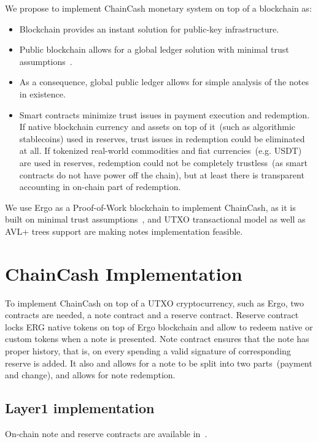 \documentclass{article}   %
\newcommand{\cc}{ChainCash}
\begin{document}
We propose to implement \cc{} monetary system on top of a blockchain as:

\begin{itemize}
  \item{} Blockchain provides an instant solution for public-key infrastructure.
  \item{} Public blockchain allows for a global ledger solution with minimal trust assumptions~\cite{kya}.
  \item{} As a consequence, global public ledger allows for simple analysis of the notes in existence.
  \item{} Smart contracts minimize trust issues in payment execution and redemption. If native blockchain currency and assets on top of it~(such as algorithmic stablecoins) used in reserves, trust issues in redemption could be eliminated at all. If tokenized real-world commodities and fiat currencies~(e.g. USDT) are used in reserves, redemption could not be completely trustless~(as smart contracts do not have power off the chain), but at least there is transparent accounting in on-chain part of redemption. 
\end{itemize}

We use Ergo as a Proof-of-Work blockchain to implement \cc{}, as it is built on minimal trust assumptions~\cite{kya}, and UTXO transactional model as well as AVL+ trees support are making notes implementation feasible.


\section{\cc{} Implementation}

To implement \cc{} on top of a UTXO cryptocurrency, such as Ergo, two contracts are needed, a note contract and a reserve contract. Reserve contract locks ERG native tokens on top of Ergo blockchain and allow to redeem native or custom tokens when a note is presented. Note contract ensures that the note has proper history, that is, on every spending a valid signature of corresponding reserve is added. It also and allows for a note to be split into two parts~(payment and change), and allows for note redemption.

\subsection{Layer1 implementation}
\label{sec:l1-impl}

On-chain note and reserve contracts are available in~\cite{contracts}.
\end{document}
